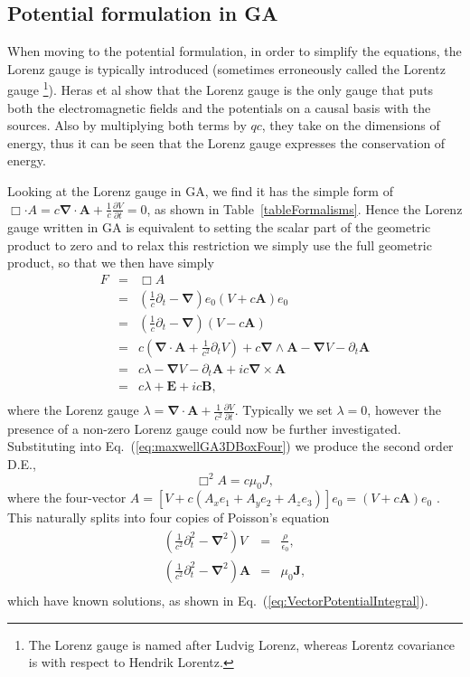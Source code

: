 \documentclass[12pt,aps,prb,preprint]{revtex4}   %
\newcommand{\be}{\begin{equation}}
\newcommand{\ee}{\end{equation}}
\newcommand{\bea}{\begin{eqnarray}}
\newcommand{\eea}{\end{eqnarray}}
\newcommand{\iGA}{{i}}
\begin{document}
\subsection{Potential formulation in GA}

When moving to the potential formulation, in order to simplify the equations, the Lorenz gauge is typically introduced (sometimes erroneously called the Lorentz gauge \footnote{The Lorenz gauge is named after Ludvig Lorenz, whereas Lorentz covariance is with respect to Hendrik Lorentz.}).
Heras et al \cite{Heras:2010} show that the Lorenz gauge is the only gauge that puts both the electromagnetic fields and the potentials on a causal basis with the sources.  Also by multiplying both terms by $ q c $, they take on the dimensions of energy, thus it can be seen that the Lorenz gauge expresses the conservation of energy.

Looking at the Lorenz gauge in GA, we find it has the simple form of $ \Box \cdot A = c \mathbf{\nabla} \cdot \mathbf{A} + \frac{1}{c} \frac{\partial V}{\partial t} =  0 $, as shown in Table~\ref{tableFormalisms}.  Hence the Lorenz gauge written in GA is equivalent to setting the scalar part of the geometric product to zero and to relax this restriction we simply use the full geometric product, so that we then have simply 
\bea \label{eq:FWithoutMonopoles}
F & = & \Box A \\ \nonumber
& = & \left (\frac{1}{c} \partial_t - \mathbf{\nabla} \right ) e_0 \left (V  + c \mathbf{A} \right ) e_0  \\ \nonumber
& = & \left (\frac{1}{c} \partial_t - \mathbf{\nabla} \right ) \left (V  - c \mathbf{A} \right )  \\ \nonumber
& = & c \left ( \mathbf{\nabla} \cdot \mathbf{A}+\frac{1}{c^2} \partial_t V \right )+  c \mathbf{\nabla} \wedge \mathbf{A} - \mathbf{\nabla} V  - \partial_t \mathbf{A}   \\ \nonumber
& = & c \lambda - \mathbf{\nabla} V - \partial_t \mathbf{A}  + \iGA c \mathbf{\nabla} \times \mathbf{A} \\ \nonumber
& = & c \lambda + \mathbf{E} + \iGA c \mathbf{B} , \\ \nonumber
\eea
where the Lorenz gauge $ \lambda = \mathbf{\nabla} \cdot \mathbf{A} + \frac{1}{c^2} \frac{ \partial V}{\partial t} $.  Typically we set $ \lambda = 0 $, however the presence of a non-zero Lorenz gauge could now be further investigated.
Substituting into Eq.~(\ref{eq:maxwellGA3DBoxFour}) we produce the second order D.E.,
\be  \label{eq:maxwellGAPotentialForm}
\Box^2 A =  c \mu_0 J ,
\ee
where the four-vector $ A =    [V +c ( A_x e_1 + A_y e_2 + A_z e_3)] e_0=    (V +c \textbf{A})e_0 $ .
This naturally splits into four copies of Poisson's equation
\bea \label{eq:fourPoissonEquations}
\left (\frac{1}{c^2} \partial_t^2 - \mathbf{\nabla}^2 \right ) V & = & \frac{\rho}{ \epsilon_0 } ,  \\ \nonumber
\left (\frac{1}{c^2} \partial_t^2 - \mathbf{\nabla}^2 \right ) \mathbf{A} & = &  \mu_0 \mathbf{J} , \\ \nonumber
\eea
which have known solutions, as shown in Eq.~(\ref{eq:VectorPotentialIntegral}).  
\end{document}

